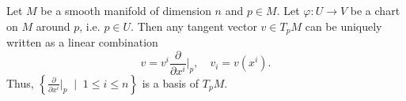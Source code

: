 \begin{proposition}\label{prop:basis_TpM}
  Let $M$ be a smooth manifold of dimension $n$ and $p\in M$.
  Let $\varphi: U \to V$ be a chart on $M$ around $p$, i.e. $p\in U$.
  Then any tangent vector $v\in T_p M$ can be uniquely written as a linear combination
  \begin{equation}
    v = v^i \frac{\partial}{\partial x^i}\Big|_p, \quad v_i = v(x^i).
  \end{equation}
  Thus, $\left\{\frac{\partial}{\partial x^i}\Big|_p\;\mid\; 1\leq i\leq n\right\}$ is a basis of $T_p M$.
\end{proposition}
